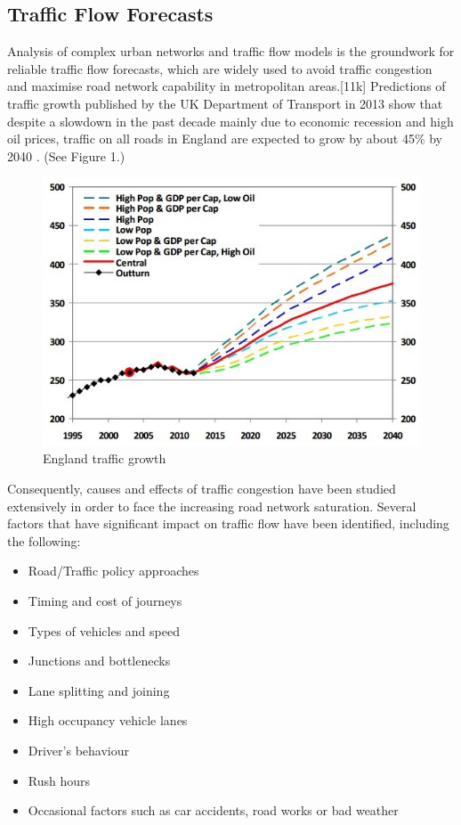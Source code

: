 \documentclass[11pt]{article}
\begin{document}
\subsection{Traffic Flow Forecasts}

Analysis of complex urban networks and traffic flow models is the groundwork for reliable traffic flow forecasts, which are widely used to avoid traffic congestion and maximise road network capability in metropolitan areas.[11k] Predictions of traffic growth published by the UK Department of Transport in 2013 show that despite a slowdown in the past decade mainly due to economic recession and high oil prices, traffic on all roads in England are expected to grow by about 45\% by 2040 \cite{10j}. (See Figure 1.)

\begin{figure}[h]
\begin{center}
\includegraphics[scale=0.7]{england_traffic}
\caption{England traffic growth}
\end{center}
\end{figure}


Consequently, causes and effects of traffic congestion have been studied extensively in order to face the increasing road network saturation. Several factors that have significant impact on traffic flow have been identified, including the following: 
\begin{singlespace}
\begin{itemize}\itemsep0pt
\item Road/Traffic policy approaches
\item Timing and cost of journeys
\item Types of vehicles and speed
\item Junctions and bottlenecks
\item Lane splitting and joining
\item High occupancy vehicle lanes
\item Driver\textquoteright s behaviour
\item Rush hours
\item Occasional factors such as car accidents, road works or bad weather
\end{itemize}
\end{singlespace}
\end{document}
